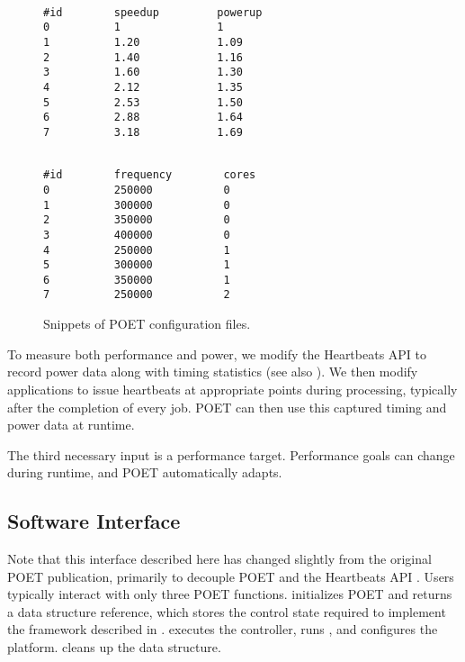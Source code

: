 \begin{figure}[t]
\centering
\begin{minipage}[t]{.45\columnwidth}
\lstset{
  belowskip=0pt,
  aboveskip=0pt,
  numbers=none,
}
\begin{lstlisting}[frame=tlr,%
  caption={System-agnostic.},%
  label={lst:control_config_example}]%

#id        speedup         powerup
0          1               1
1          1.20            1.09
2          1.40            1.16
3          1.60            1.30
4          2.12            1.35
5          2.53            1.50
6          2.88            1.64
7          3.18            1.69
\end{lstlisting}
\end{minipage}
\hspace*{0.4cm}
\begin{minipage}[t]{.45\columnwidth}
\lstset{
  belowskip=0pt,
  aboveskip=0pt,
  numbers=none,
}
\begin{lstlisting}[frame=tlr,%
  caption={System-specific.},%
  label={lst:cpu_config_example}]%

#id        frequency        cores
0          250000           0
1          300000           0
2          350000           0
3          400000           0
4          250000           1
5          300000           1
6          350000           1
7          250000           2
\end{lstlisting}
\end{minipage}
\caption{Snippets of POET configuration files.}
\label{fig:poet-config-examples}
\end{figure}

To measure both performance and power, we modify the Heartbeats API \cite{PTRADE} to record power data along with timing statistics (see also ).
We then modify applications to issue heartbeats at appropriate points during processing, typically after the completion of every job.
POET can then use this captured timing and power data at runtime.

The third necessary input is a performance target.
Performance goals can change during runtime, and POET automatically adapts.


\subsection{Software Interface}
\label{sec:poet-interface}

Note that this interface described here has changed slightly from the original POET publication, primarily to decouple POET and the Heartbeats API \cite{POET}.
Users typically interact with only three POET functions.
 initializes POET and returns a  data structure reference, which stores the control state required to implement the framework described in .
 executes the controller, runs , and configures the platform.
 cleans up the  data structure.

